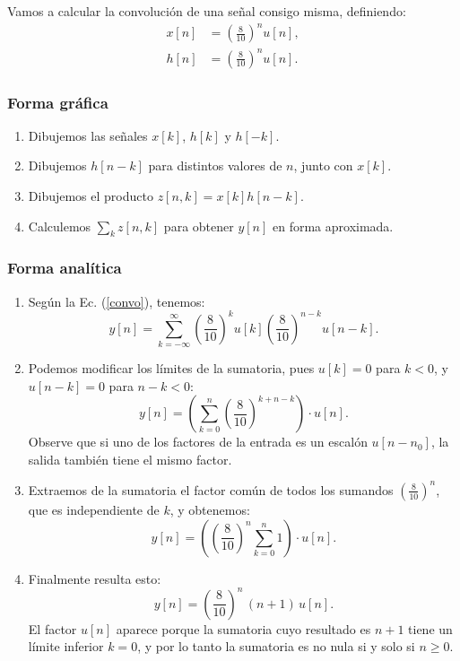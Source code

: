 Vamos a calcular la convolución de una señal consigo misma, definiendo:
\begin{align}
	x[n] &= \left( \frac{8}{10}\right)^n u[n], \\
	h[n] &= \left( \frac{8}{10}\right)^n u[n].
\end{align}

\subsubsection{Forma gráfica}

\begin{enumerate}
	\item Dibujemos las señales $x[k]$, $h[k]$ y $h[-k]$.
	\item Dibujemos $h[n-k]$ para distintos valores de $n$, junto con $x[k]$.
	\item Dibujemos el producto $z[n,k] = x[k] h[n-k]$.
	\item Calculemos $\sum_{k}z[n,k]$ para obtener $y[n]$ en forma aproximada.
\end{enumerate}

\subsubsection{Forma analítica}

\begin{enumerate}
	\item Según la Ec. (\ref{convo}), tenemos:
	\begin{equation}
		y[n] = \sum_{k=-\infty}^{\infty} \left( \frac{8}{10}\right)^k u[k] \left( \frac{8}{10}\right)^{n-k} u[n-k].
	\end{equation}
	
	\item Podemos modificar los límites de la sumatoria, pues $u[k] = 0$ para $k < 0$, y $u[n-k] = 0$ para $n - k < 0$:
	\begin{equation}
		y[n] = \left( \sum_{k=0}^{n} \left( \frac{8}{10}\right)^{k+n-k} \right) \cdot u[n].
	\end{equation}
	Observe que si uno de los factores de la entrada es un escalón $u[n - n_{0}]$, la salida también tiene el mismo factor.
	
	\item Extraemos de la sumatoria el factor común de todos los sumandos $\left(\frac{8}{10}\right)^n$, que es independiente de $k$, y obtenemos:
	\begin{equation}
		y[n] = \left( \left( \frac{8}{10}\right)^n \sum_{k=0}^{n} 1 \right) \cdot u[n].
	\end{equation}
	
	\item Finalmente resulta esto:
	\begin{equation}
		y[n] = \left( \frac{8}{10}\right)^n \, (n+1) \, u[n].
	\end{equation}
	El factor $u[n]$ aparece porque la sumatoria cuyo resultado es $n + 1$ tiene un límite inferior $k = 0$, y por lo tanto la sumatoria es no nula si y solo si $n \geq 0$.
\end{enumerate}